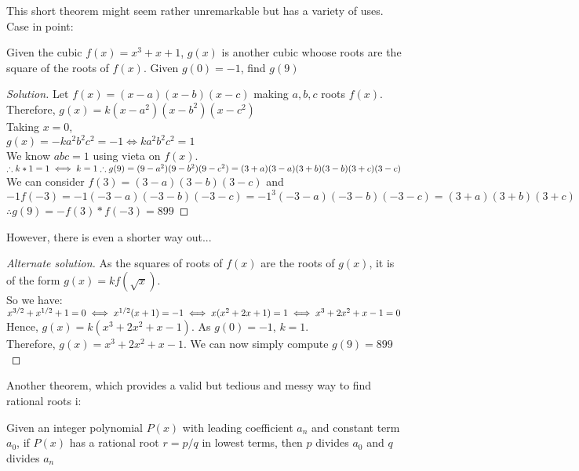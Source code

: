 This short theorem might seem rather unremarkable but has a variety of uses. Case in point:\\
\begin{example}
    Given the cubic $f(x)=x^3+x+1$, $g(x)$ is another cubic whoose roots are the square of the roots of $f(x)$. Given $g(0)=-1$, find $g(9)$
\end{example}
\begin{proof}
    [Solution]
    Let $f(x)=(x-a)(x-b)(x-c)$ making $a,b,c$ roots $f(x)$.\\
    Therefore, $g(x)=k(x-a^2)(x-b^2)(x-c^2)$\\
    Taking $x=0$,\\
    $g(x)=-ka^2b^2c^2=-1 \iff ka^2b^2c^2=1$\\
    We know $abc=1$ using vieta on $f(x)$.\\
    $\therefore k*1=1 \iff k=1\\
    \therefore g(9)=(9-a^2)(9-b^2)(9-c^2)\\
    =(3+a)(3-a)(3+b)(3-b)(3+c)(3-c)$\\
    We can consider $f(3)=(3-a)(3-b)(3-c)$ and $-1f(-3)=-1(-3-a)(-3-b)(-3-c)=-1^3(-3-a)(-3-b)(-3-c)=(3+a)(3+b)(3+c)$\\
    $\therefore g(9) = -f(3)*f(-3)=899$
\end{proof}
However, there is even a shorter way out...\\
\begin{proof}
    [Alternate solution]
    As the squares of roots of $f(x)$ are the roots of $g(x)$, it is of the form $g(x)=kf(\sqrt{x})$.\\
    So we have: $x^{3/2}+x^{1/2}+1=0\\
    \iff x^{1/2}(x+1)=-1\\
    \iff x(x^2+2x+1)=1\\
    \iff x^3+2x^2+x-1=0$\\
    Hence, $g(x)=k(x^3+2x^2+x-1)$. As $g(0)=-1$, $k=1$.\\
    Therefore, $g(x)=x^3+2x^2+x-1$. We can now simply compute $g(9)=899$
\end{proof}
Another theorem, which provides a valid but tedious and messy way to find rational roots i:\\
\begin{theorem}
    Given an integer polynomial $P(x)$ with leading coefficient $a_n$ and constant term $a_0$, if $P(x)$ has a rational root $r = p/q$ in lowest terms, then $p$ divides $a_0$ and $q$ divides $a_n$
\end{theorem}
